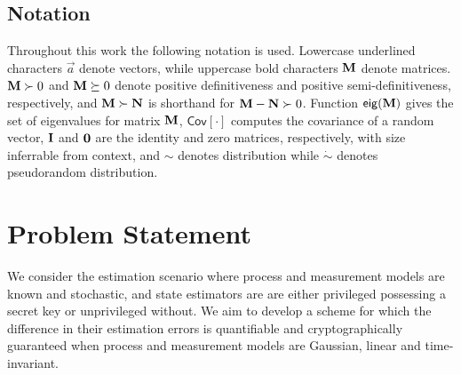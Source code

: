 \documentclass[letterpaper, 10 pt, conference]{IEEEtran}
\theoremstyle{definition}
\begin{document}
% 
% 

\subsection{Notation}
Throughout this work the following notation is used. Lowercase underlined characters $\vec{a}$ denote vectors, while uppercase bold characters ${{\mathbf{M}}}$ denote matrices. ${{\mathbf{M}}}\succ 0$ and ${{\mathbf{M}}} \succeq 0$ denote positive definitiveness and positive semi-definitiveness, respectively, and ${{\mathbf{M}}} \succ {\ensuremath{{\mathbf{N}}}}$ is shorthand for ${{\mathbf{M}}}-{{\mathbf{N}}}\succ 0$. Function $\mathsf{eig}({{\mathbf{M}}})$ gives the set of eigenvalues for matrix ${{\mathbf{M}}}$, $\mathsf{Cov}[\cdot]$ computes the covariance of a random vector, ${{\mathbf{I}}}$ and ${{\mathbf{0}}}$ are the identity and zero matrices, respectively, with size inferrable from context, and $\sim$ denotes distribution while $\dot{\sim}$ denotes pseudorandom distribution.

% 
%                                              
%                                              
%                                              
% 

\section{Problem Statement}\label{sec:problem_statement}
We consider the estimation scenario where process and measurement models are known and stochastic, and state estimators are are either privileged possessing a secret key or unprivileged without. We aim to develop a scheme for which the difference in their estimation errors is quantifiable and cryptographically guaranteed when process and measurement models are Gaussian, linear and time-invariant.
\end{document}

